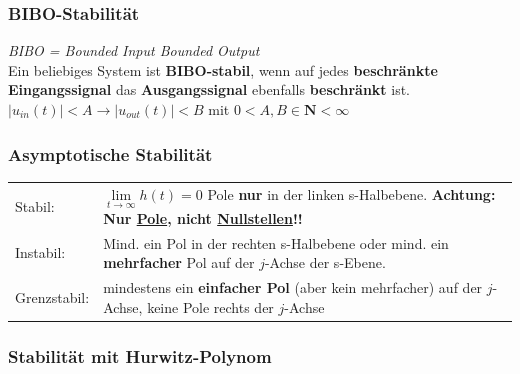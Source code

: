 		\subsubsection{BIBO-Stabilität }
			\textit{BIBO = Bounded Input Bounded Output}\\
					Ein beliebiges System ist \textbf{BIBO-stabil}, wenn auf jedes \textbf{beschränkte Eingangssignal}
					das \textbf{Ausgangssignal} ebenfalls \textbf{beschränkt} ist.$|u_{in}(t)| < A \rightarrow |u_{out}(t)| < B$ mit $0 < A,B \in \mathbf{N} < \infty$
		
	\subsubsection{Asymptotische Stabilität }
		
			\begin{tabular}{ll}
				Stabil: 
			& 	$\lim\limits_{t\rightarrow\infty} h(t) = 0$ \qquad Pole \textbf{nur} in der linken s-Halbebene.
				\textbf{Achtung: Nur \underline{Pole}, nicht \underline{Nullstellen}!!}
			\\
				Instabil: 
			& 	Mind. ein Pol in der rechten s-Halbebene oder mind. ein \textbf{mehrfacher} Pol auf der $j$-Achse der s-Ebene.
			\\
				Grenzstabil:
			& 	mindestens ein \textbf{einfacher Pol} (aber kein mehrfacher) auf der $j$-Achse, keine Pole rechts der $j$-Achse
			\end{tabular}
		
		
		\subsubsection{Stabilität mit Hurwitz-Polynom }
		
